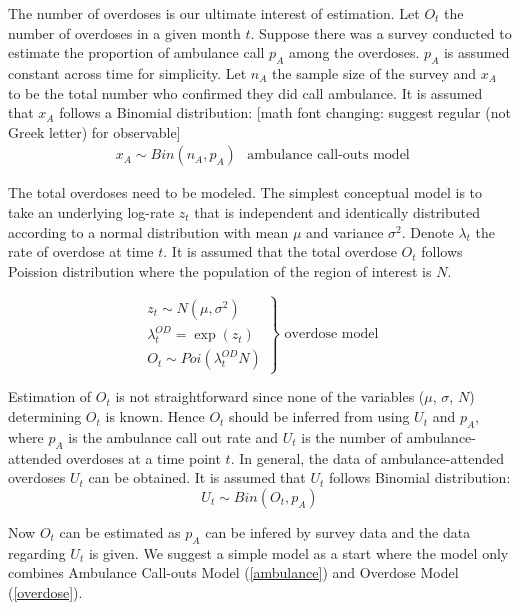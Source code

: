 \documentclass[
10pt, %
letterpaper, %
oneside, %
headinclude,footinclude, %
BCOR5mm, %
]{article}
\begin{document}
\normalsize
 The number of overdoses is our ultimate interest of estimation.  Let $O_t$ the number of overdoses in a given month $t$. Suppose there was a survey  conducted to estimate the proportion of ambulance call $p_A$ among the overdoses. $p_A$ is assumed constant across time for simplicity. Let $n_{A}$ the sample size of the survey and   
$x_{A}$ to be the total number who confirmed they did call ambulance. It is assumed that $x_{A}$ follows a Binomial distribution:
[math font changing: suggest regular (not Greek letter) for observable]
\begin{equation}
\label{ambulance}
	\left.\begin{aligned}
	x_{A} \sim Bin(n_{A},p_{A})
	\end{aligned}\right.
	\text{		ambulance call-outs model}
\end{equation}

The total overdoses need to be modeled. The simplest conceptual model is to take an underlying log-rate $z_t$ that is independent and identically distributed according to a normal distribution with mean $\mu$ and variance $\sigma^2$. \cite{Irvine:modelling} Denote $\lambda_{t}$ the rate of overdose at time $t$. It is assumed that the total overdose $O_t$ follows Poission distribution where the population of the region of interest is $N$. 

\begin{equation}
\label{overdose}
\left.\begin{aligned}
z_{t} \sim N(\mu, \sigma^{2}) \\
\lambda_{t}^{OD} = \exp(z_{t})\\
O_{t} \sim Poi(\lambda_{t}^{OD}N) 
\end{aligned}\right\} 
\text{		overdose model} 
\end{equation}



Estimation of $O_t$ is not straightforward since none of the variables ($\mu$, $\sigma$, $N$) determining $O_t$  is known. Hence $O_t$ should be inferred from using $U_t$ and \(p_A\), where $p_A$ is the ambulance call out rate and \(U_t\) is the number of  ambulance-attended overdoses at a time point $t$. In general, the data of ambulance-attended overdoses \(U_t\) can be obtained. It is assumed that  \(U_t\) follows Binomial distribution: 
\begin{equation}
\label{over_amb}
\left.
U_t \sim Bin(O_t, p_A)
\right.
\end{equation}

Now $O_t$ can be estimated as $p_A$ can be infered by survey data and the data regarding $U_t$ is given. We suggest a simple model as a start where the model only combines Ambulance Call-outs Model (\ref{ambulance}) and Overdose Model (\ref{overdose}). 
\end{document}
